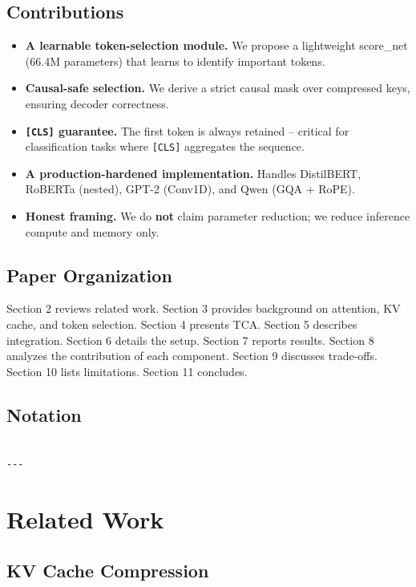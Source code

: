 \subsection{Contributions}

\begin{itemize}
\item \textbf{A learnable token-selection module.} We propose a lightweight
  score\_net (66.4M parameters) that learns to identify
  important tokens.
\item \textbf{Causal-safe selection.} We derive a strict causal mask over compressed
  keys, ensuring decoder correctness.
\item \textbf{\texttt{[CLS]} guarantee.} The first token is always retained -- critical for
  classification tasks where \texttt{[CLS]} aggregates the sequence.
\item \textbf{A production-hardened implementation.} Handles DistilBERT, RoBERTa
  (nested), GPT-2 (Conv1D), and Qwen (GQA + RoPE).
\item \textbf{Honest framing.} We do \textbf{not} claim parameter reduction; we reduce
  inference compute and memory only.

\end{itemize}
\subsection{Paper Organization}

Section 2 reviews related work. Section 3 provides background on attention, 
KV cache, and token selection. Section 4 presents TCA. Section 5 describes 
integration. Section 6 details the setup. Section 7 reports results. 
Section 8 analyzes the contribution of each component. Section 9 discusses 
trade-offs. Section 10 lists limitations. Section 11 concludes.



\subsection{Notation}

\begin{lstlisting}

---
\end{lstlisting}

\section{Related Work}

\subsection{KV Cache Compression}

